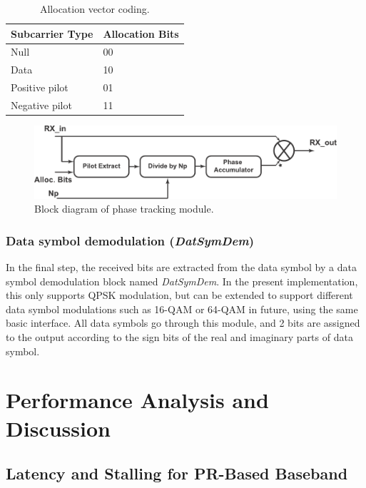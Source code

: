\begin{table}[h]
\centering
\caption{Allocation vector coding.}{
\label{tab:alloc_vec}
\renewcommand{\arraystretch}{1.3}
\begin{tabular}{@{}ll@{}}
\toprule
Subcarrier Type		&  Allocation Bits 	\\ \midrule
Null					&  00				\\
Data				&  10				\\
Positive pilot			&  01				\\
Negative pilot		&  11				\\
\end{tabular}
}
\end{table}
\begin{figure}
\centering
\includegraphics [width=0.9\columnwidth]{Figures/MSCR_RX_Phase.pdf}
\caption{Block diagram of phase tracking module.}
\label{fig:Phase}
\end{figure}

\subsubsection{Data symbol demodulation (\emph{DatSymDem})}
In the final step, the received bits are extracted from the data symbol by a data symbol demodulation block named \emph{DatSymDem}.
In the present implementation, this only supports QPSK modulation, but can be extended to support different data symbol modulations such as 16-QAM or 64-QAM in future, using the same basic interface.
All data symbols go through this module, and 2 bits are assigned to the output according to the sign bits of the real and imaginary parts of data symbol.


\section{Performance Analysis and Discussion}
\label{sec:PerAna}
\subsection{Latency and Stalling for PR-Based Baseband}

